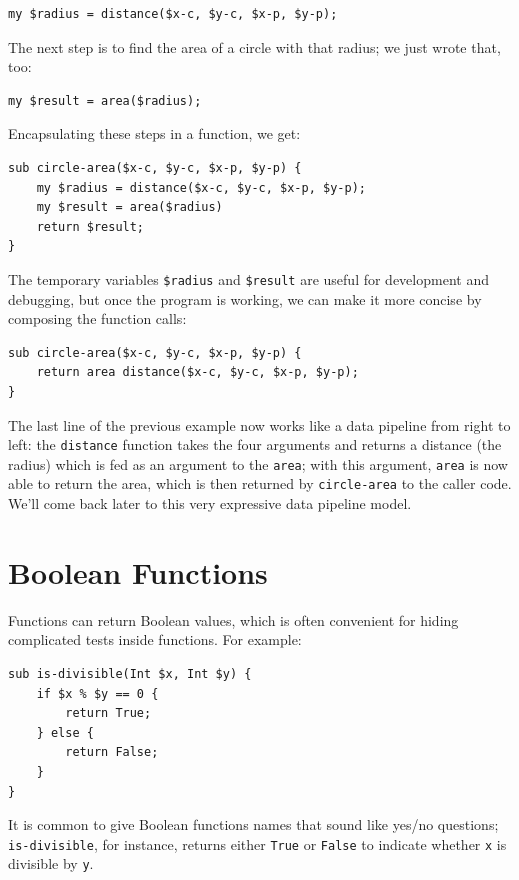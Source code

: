 \begin{verbatim}
my $radius = distance($x-c, $y-c, $x-p, $y-p);
\end{verbatim}
%
The next step is to find the area of a circle with that radius;
we just wrote that, too:

\begin{verbatim}
my $result = area($radius);
\end{verbatim}
%
Encapsulating these steps in a function, we get:

\begin{verbatim}
sub circle-area($x-c, $y-c, $x-p, $y-p) {
    my $radius = distance($x-c, $y-c, $x-p, $y-p);
    my $result = area($radius)
    return $result;
}
\end{verbatim}
%
The temporary variables {\tt \$radius} and {\tt \$result} are useful for
development and debugging, but once the program is working, we can
make it more concise by composing the function calls:

\begin{verbatim}
sub circle-area($x-c, $y-c, $x-p, $y-p) {
    return area distance($x-c, $y-c, $x-p, $y-p);
}
\end{verbatim}
%

The last line of the previous example now works like a data 
pipeline from right to left: the \verb'distance' function 
takes the four arguments and returns a distance (the radius) 
which is fed as an argument to the \verb'area'; with this 
argument, \verb'area' is now able to return the area, which 
is then returned by \verb'circle-area' to the caller code. 
We'll come back later to this very expressive data pipeline 
model.

\section{Boolean Functions}
\label{boolean}

Functions can return Boolean values, which is often convenient for hiding
complicated tests inside functions. For example:

\begin{verbatim}
sub is-divisible(Int $x, Int $y) {
    if $x % $y == 0 {
        return True;
    } else {
        return False;
    }
}
\end{verbatim}
%
It is common to give Boolean functions names that sound like yes/no
questions; \verb"is-divisible", for instance, returns either 
{\tt True} or {\tt False} to indicate whether {\tt x} is 
divisible by {\tt y}.

